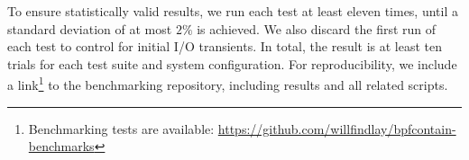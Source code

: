 To ensure statistically valid results, we run each test at least eleven times, until
a standard deviation of at most $2\%$ is achieved. We also discard the first run of each
test to control for initial I/O transients. In total, the result is at least ten trials
for each test suite and system configuration. For reproducibility, we include
a link\footnote{Benchmarking tests are available:
\url{https://github.com/willfindlay/bpfcontain-benchmarks}} to the benchmarking
repository, including results and all related scripts.







